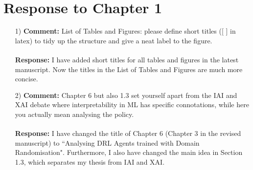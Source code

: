 \documentclass[11pt]{article}
\begin{document}
\section*{Response to Chapter 1}
\begin{enumerate}
\item[1)] \textbf{Comment:} List of Tables and Figures: please define short titles ([ ] in latex) to tidy up the structure and give a neat label to the figure.\\ \\
\textbf{Response:} I have added short titles for all tables and figures in the latest manuscript. Now the titles in the List of Tables and Figures are much more concise.

\item[2)] \textbf{Comment:} Chapter 6 but also 1.3 set yourself apart from the IAI and XAI debate where interpretability in ML has specific connotations, while here you actually mean analysing the policy. \\ \\
\textbf{Response:} I have changed the title of Chapter 6 (Chapter 3 in the revised manuscript) to ``Analysing DRL Agents trained with Domain Randomisation". Furthermore, I also have changed the main idea in Section 1.3, which separates my thesis from IAI and XAI.

\end{enumerate}

\newpage
\end{document}

